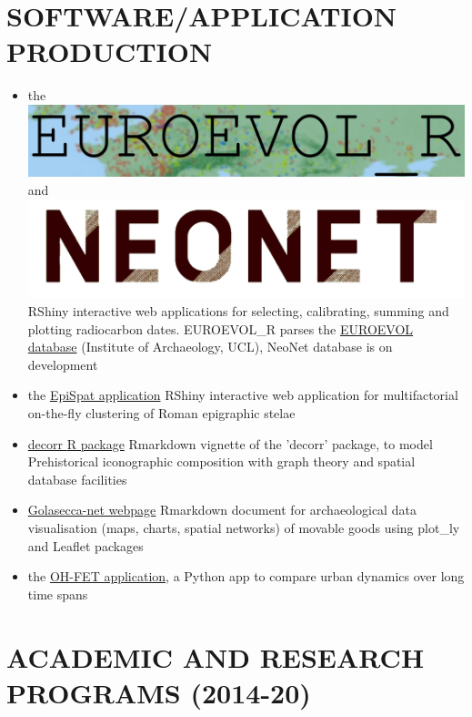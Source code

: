 \documentclass[11pt]{report} %
\begin{document}
\section*{SOFTWARE/APPLICATION PRODUCTION}

\begin{itemize}
 \item the \href{https://neolithic.shinyapps.io/Euroevol\_R/}{\includegraphics[scale=0.20]{"euroevol_R"}} and \href{https://neolithic.shinyapps.io/neonet/}{\includegraphics[scale=0.04]{"neonet"}} RShiny interactive web applications for selecting, calibrating, summing and plotting radiocarbon dates. EUROEVOL\_R parses the \href{http://discovery.ucl.ac.uk/1469811/}{EUROEVOL database} (Institute of Archaeology, UCL), NeoNet database is on development
  \item the \href{https://epispat.shinyapps.io/analyses_mult_5/}{EpiSpat application} RShiny interactive web application for multifactorial on-the-fly clustering of Roman epigraphic stelae
  \item \href{https://zoometh.github.io/iconr/docs/}{decorr \textsf{R} package} Rmarkdown vignette of the 'decorr' package, to model Prehistorical iconographic composition with graph theory and spatial database facilities
\item \href{https://zoometh.github.io/golasecca/}{Golasecca-net webpage} Rmarkdown document for archaeological data visualisation (maps, charts, spatial networks) of movable goods using plot\_ly and Leaflet packages
  \item the \href{https://www.oxbowbooks.com/dbbc/caa2014-21st-century-archaeology.html/}{OH-FET application}, a \textsf{Python} app to compare urban dynamics over long time spans
\end{itemize}


\section*{ACADEMIC AND RESEARCH PROGRAMS (2014-20)}
\end{document}

